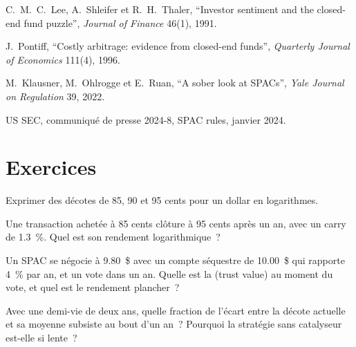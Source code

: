 \begin{omsources}
\item C.~M.~C.~Lee, A.~Shleifer et R.~H.~Thaler, ``Investor sentiment and the closed-end fund puzzle'', \emph{Journal of Finance} 46(1), 1991.
\item J.~Pontiff, ``Costly arbitrage: evidence from closed-end funds'', \emph{Quarterly Journal of Economics} 111(4), 1996.
\item M.~Klausner, M.~Ohlrogge et E.~Ruan, ``A sober look at SPACs'', \emph{Yale Journal on Regulation} 39, 2022.
\item US SEC, communiqué de presse 2024-8, SPAC rules, janvier 2024.
\end{omsources}

\section{Exercices}

\begin{exercise}[$\star$]\label{exo:s1:share-classes-holding-companies-closed-end-funds-spacs:1}
Exprimer des décotes de 85, 90 et 95 cents pour un dollar en logarithmes.
\end{exercise}

\begin{exercise}[$\star$]\label{exo:s1:share-classes-holding-companies-closed-end-funds-spacs:2}
Une transaction achetée à 85 cents clôture à 95 cents après un an, avec un carry de 1.3~\%. Quel est son rendement logarithmique~?
\end{exercise}

\begin{exercise}[$\star$]\label{exo:s1:share-classes-holding-companies-closed-end-funds-spacs:3}
Un SPAC se négocie à 9.80~\$ avec un compte séquestre de 10.00~\$ qui rapporte 4~\% par an, et un vote dans un an. Quelle est la  (trust value) au moment du vote, et quel est le rendement plancher~?
\end{exercise}

\begin{exercise}[$\star\star$]\label{exo:s1:share-classes-holding-companies-closed-end-funds-spacs:4}
Avec une demi-vie de deux ans, quelle fraction de l'écart entre la décote actuelle et sa moyenne subsiste au bout d'un an~? Pourquoi la stratégie sans catalyseur est-elle si
lente~?
\end{exercise}

